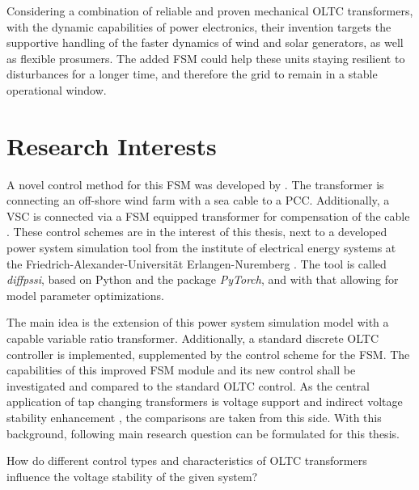Considering a combination of reliable and proven mechanical \acs{OLTC} transformers, with the dynamic capabilities of power electronics, their invention targets the supportive handling of the faster dynamics of wind and solar generators, as well as flexible prosumers.
The added \acf{FSM} could help these units staying resilient to disturbances for a longer time, and therefore the grid to remain in a stable operational window. 

\newpage

\section{Research Interests}
\label{sec:research-interests}

A novel control method for this \acs{FSM} was developed by \textcite{burlakin_2024}.
The transformer is connecting an off-shore wind farm with a sea cable to a \ac{PCC}.
Additionally, a \acf{VSC} is connected via a \acs{FSM} equipped transformer for compensation of the cable \autocite{burlakin_2024a}.
These control schemes are in the interest of this thesis, next to a developed power system simulation tool from the institute of electrical energy systems at the Friedrich-Alexander-Universität Erlangen-Nuremberg \autocite{kordowich_2023}.
The tool is called \textit{diffpssi}, based on Python and the package \textit{PyTorch}, and with that allowing for model parameter optimizations.

The main idea is the extension of this power system simulation model with a capable variable ratio transformer.
Additionally, a standard discrete \acs{OLTC} controller is implemented, supplemented by the control scheme for the \acs{FSM}.
The capabilities of this improved \acs{FSM} module and its new control shall be investigated and compared to the standard \acs{OLTC} control.
As the central application of tap changing transformers is voltage support and indirect voltage stability enhancement \autocite{kundur_2022,milano_2010}, the comparisons are taken from this side.
With this background, following main research question can be formulated for this thesis.

\begin{tcolorbox}[float, colback=ees_blue!5!white,colframe=ees_blue, toptitle=1mm, bottomtitle=1mm, left=2mm, right=2.5mm, top=2mm, bottom=2mm, title={\textbf{Research Question of this Thesis}}]
    How do different control types and characteristics of \acf{OLTC} transformers influence the voltage stability of the given system?
\end{tcolorbox}

